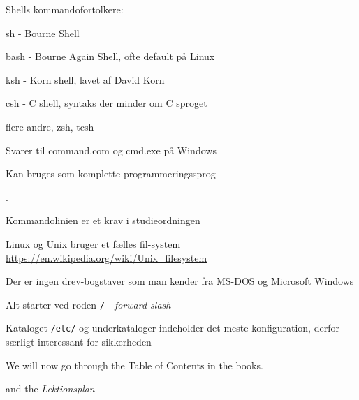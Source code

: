 \documentclass[Screen16to9,17pt]{foils}
\begin{document}

\begin{list1}
\item Shells kommandofortolkere:
  \begin{list2}
    \item sh - Bourne Shell
\item bash - Bourne Again Shell, ofte default på Linux
\item ksh - Korn shell, lavet af David Korn
\item csh - C shell, syntaks der minder om C sproget
\item flere andre, zsh, tcsh
  \end{list2}
\item Svarer til command.com og cmd.exe på Windows
\item Kan bruges som komplette programmeringssprog
\end{list1}



.
\begin{list2}
\item Kommandolinien er et krav i studieordningen \smiley
\item Linux og Unix bruger et fælles fil-system\\
\url{https://en.wikipedia.org/wiki/Unix_filesystem}
\item Der er ingen drev-bogstaver som man kender fra MS-DOS og Microsoft Windows
\item Alt starter ved roden \verb+/+ - \emph{forward slash}
\item Kataloget \verb+/etc/+ og underkataloger indeholder det meste konfiguration, derfor særligt interessant for sikkerheden
\end{list2}




We will now go through the Table of Contents in the books.

and the \emph{Lektionsplan}\\



\end{document}
